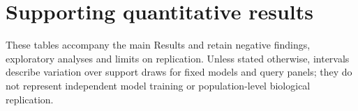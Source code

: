 \clearpage
\section*{Supporting quantitative results}
\begingroup
{}
\small
\setlength{\tabcolsep}{3pt}
\setlength{\LTpre}{8pt}
\setlength{\LTpost}{8pt}
\setcounter{table}{0}
\renewcommand{\thetable}{S\arabic{table}}
\renewcommand{\theHtable}{supp.\arabic{table}}
These tables accompany the main Results and retain negative findings, exploratory analyses and limits on replication. Unless stated otherwise, intervals describe variation over support draws for fixed models and query panels; they do not represent independent model training or population-level biological replication.

\clearpage

\clearpage

\clearpage

\clearpage

\clearpage

\clearpage

\clearpage

\clearpage

\endgroup
